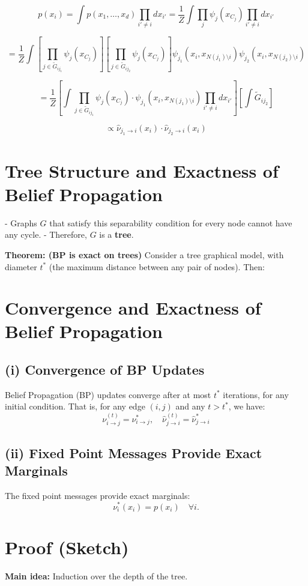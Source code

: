 \documentclass{article}%
\begin{document}
\[
p(x_i) = \int p(x_1, \dots, x_d) \prod_{i' \neq i} dx_{i'} 
= \frac{1}{Z} \int \prod_{j} \psi_j(x_{C_j}) \prod_{i' \neq i} dx_{i'}
\]

\[
= \frac{1}{Z} \int \left[ \prod_{j \in \tilde{G}_{ij_1}} \psi_j(x_{C_j}) \right] 
\left[ \prod_{j \in \tilde{G}_{ij_2}} \psi_j(x_{C_j}) \right] 
\psi_{j_1}(x_i, x_{N(j_1) \setminus i}) \psi_{j_2}(x_i, x_{N(j_2) \setminus i})
\]

\[
= \frac{1}{Z} \left[ \int \prod_{j \in \tilde{G}_{ij_1}} \psi_j(x_{C_j}) \cdot 
\psi_{j_1}(x_i, x_{N(j_1) \setminus i}) \prod_{i' \neq i} dx_{i'} \right]
\left[ \int \tilde{G}_{ij_2} \right]
\]

\[
\propto \hat{\nu}_{j_1 \to i}(x_i) \cdot \hat{\nu}_{j_2 \to i}(x_i)
\]

\section*{Tree Structure and Exactness of Belief Propagation}

- Graphs \( G \) that satisfy this separability condition for every node cannot have any cycle.
- Therefore, \( G \) is a \textbf{tree}.

\textbf{Theorem: (BP is exact on trees)} Consider a tree graphical model, with diameter \( t^* \) (the maximum distance between any pair of nodes). Then:


\section*{Convergence and Exactness of Belief Propagation}

\subsection*{(i) Convergence of BP Updates}
Belief Propagation (BP) updates converge after at most \( t^* \) iterations, for any initial condition. That is, for any edge \( (i,j) \) and any \( t > t^* \), we have:
\[
\nu_{i \to j}^{(t)} = \nu_{i \to j}^{*}, \quad \hat{\nu}_{j \to i}^{(t)} = \hat{\nu}_{j \to i}^{*}
\]

\subsection*{(ii) Fixed Point Messages Provide Exact Marginals}
The fixed point messages provide exact marginals:
\[
\nu_i^*(x_i) = p(x_i) \quad \forall i.
\]

\section*{Proof (Sketch)}
\textbf{Main idea:} Induction over the depth of the tree.
\end{document}
